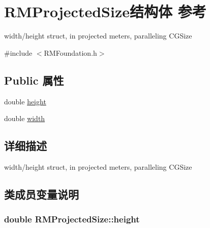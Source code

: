 \hypertarget{struct_r_m_projected_size}{\section{R\-M\-Projected\-Size结构体 参考}
\label{struct_r_m_projected_size}
}


width/height struct, in projected meters, paralleling C\-G\-Size  




{\ttfamily \#include $<$R\-M\-Foundation.\-h$>$}

\subsection*{Public 属性}
\begin{DoxyCompactItemize}
\item 
double \hyperlink{struct_r_m_projected_size_ab9814bdb4f5941ed14dacc81edc67c44}{height}
\item 
double \hyperlink{struct_r_m_projected_size_ab2d82f0c01ef95a523287018dd6966f5}{width}
\end{DoxyCompactItemize}


\subsection{详细描述}
width/height struct, in projected meters, paralleling C\-G\-Size 

\subsection{类成员变量说明}
\hypertarget{struct_r_m_projected_size_ab9814bdb4f5941ed14dacc81edc67c44}{
\subsubsection[{height}]{\setlength{\rightskip}{0pt plus 5cm}double R\-M\-Projected\-Size\-::height}}\label{struct_r_m_projected_size_ab9814bdb4f5941ed14dacc81edc67c44}


